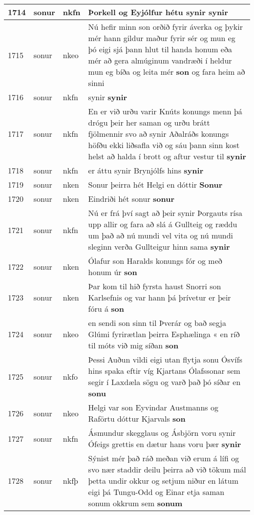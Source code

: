 \documentclass{article}
\begin{document}
\begin{longtable}{p{1cm}|p{1cm}|p{1cm}|p{13cm}}
\hline
1714&sonur&nkfn&Þorkell og Eyjólfur hétu synir \textbf{synir} \\
\hline
1715&sonur&nkeo&Nú hefir minn son orðið fyrir áverka og þykir mér hann gildur maður fyrir sér og mun eg þó eigi sjá þann hlut til handa honum eða mér að gera almúginum vandræði í heldur mun eg bíða og leita mér \textbf{son} og fara heim að sinni\\
\hline
1716&sonur&nkfn&synir \textbf{synir} \\
\hline
1717&sonur&nkfn&En er við urðu varir Knúts konungs menn þá drógu þeir her saman og urðu brátt fjölmennir svo að synir Aðalráðs konungs höfðu ekki liðsafla við og sáu þann sinn kost helst að halda í brott og aftur vestur til \textbf{synir} \\
\hline
1718&sonur&nkfn&er áttu synir Brynjólfs hins \textbf{synir} \\
\hline
1719&sonur&nken&Sonur þeirra hét Helgi en dóttir \textbf{Sonur} \\
\hline
1720&sonur&nken&Eindriði hét sonur \textbf{sonur} \\
\hline
1721&sonur&nkfn&Nú er frá því sagt að þeir synir Þorgauts rísa upp allir og fara að slá á Gullteig og ræddu um það að nú mundi vel vita og nú mundi sleginn verða Gullteigur hinn sama \textbf{synir} \\
\hline
1722&sonur&nken&Ólafur son Haralds konungs fór og með honum úr \textbf{son} \\
\hline
1723&sonur&nken&Þar kom til hið fyrsta haust Snorri son Karlsefnis og var hann þá þrívetur er þeir fóru á \textbf{son} \\
\hline
1724&sonur&nkeo&en sendi son sinn til Þverár og bað segja Glúmi fyrirætlan þeirra Esphælinga « en ríð til móts við mig síðan \textbf{son} \\
\hline
1725&sonur&nkfo&Þessi Auðun vildi eigi utan flytja sonu Ósvífs hins spaka eftir víg Kjartans Ólafssonar sem segir í Laxdæla sögu og varð það þó síðar en \textbf{sonu} \\
\hline
1726&sonur&nkeo&Helgi var son Eyvindar Austmanns og Raförtu dóttur Kjarvals \textbf{son} \\
\hline
1727&sonur&nkfn&Ásmundur skegglaus og Ásbjörn voru synir Ófeigs grettis en dætur hans voru þær \textbf{synir} \\
\hline
1728&sonur&nkfþ&Sýnist mér það ráð meðan við erum á lífi og svo nær staddir deilu þeirra að við tökum mál þetta undir okkur og setjum niður en látum eigi þá Tungu-Odd og Einar etja saman sonum okkrum sem \textbf{sonum} \\

\end{longtable}
\end{document}
